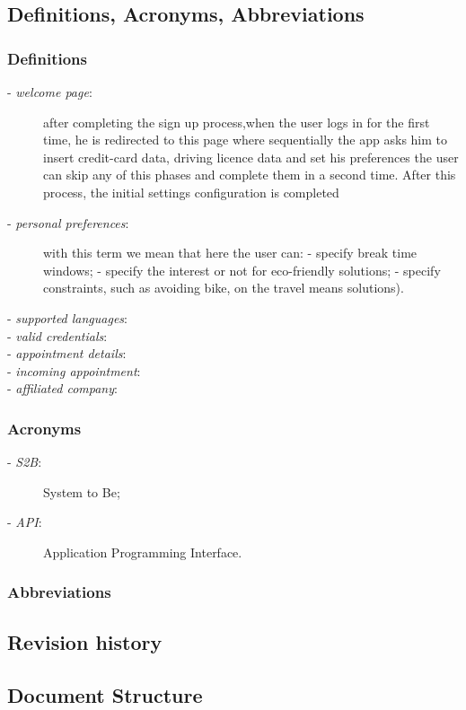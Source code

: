 \subsection{Definitions, Acronyms, Abbreviations}
	\subsubsection{Definitions}
		\begin{description}
			\item[- \textit{welcome page}:] after completing the sign up process,when the user logs in for the first time, he is redirected to this page where sequentially the app asks him to insert credit-card data, driving licence data and set his preferences the user can skip any of this phases and complete them in a second time. After this process, the initial settings configuration is completed
			\item[- \textit{personal preferences}:] with this term we mean that here the user can:\newline
			- specify break time windows; \newline
			- specify the interest or not for eco-friendly solutions;\newline
			- specify constraints, such as avoiding  bike, on the travel means solutions).
			\item[- \textit{supported languages}:]
			\item[- \textit{valid credentials}:]
			\item[- \textit{appointment details}:]
			\item[- \textit{incoming appointment}:]
			\item[- \textit{affiliated company}:]
		\end{description}
	\subsubsection{Acronyms}
		\begin{description}
		\item[- \textit{S2B}:] System to Be;
		\item[- \textit{API}:] Application Programming Interface.
	\end{description}
	\subsubsection{Abbreviations}
\subsection{Revision history}
\subsection{Document Structure}